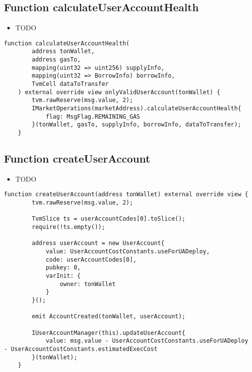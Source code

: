 \subsection{Function calculateUserAccountHealth}

\noindent\begin{itemize}
\item TODO
\end{itemize}

\begin{lstlisting}[firstnumber=446]
    function calculateUserAccountHealth(
        address tonWallet, 
        address gasTo,
        mapping(uint32 => uint256) supplyInfo,
        mapping(uint32 => BorrowInfo) borrowInfo,
        TvmCell dataToTransfer
    ) external override view onlyValidUserAccount(tonWallet) {
        tvm.rawReserve(msg.value, 2);
        IMarketOperations(marketAddress).calculateUserAccountHealth{
            flag: MsgFlag.REMAINING_GAS
        }(tonWallet, gasTo, supplyInfo, borrowInfo, dataToTransfer);
    }
\end{lstlisting}

\subsection{Function createUserAccount}

\noindent\begin{itemize}
\item TODO
\end{itemize}

\begin{lstlisting}[firstnumber=97]
    function createUserAccount(address tonWallet) external override view {
        tvm.rawReserve(msg.value, 2);

        TvmSlice ts = userAccountCodes[0].toSlice();
        require(!ts.empty());

        address userAccount = new UserAccount{
            value: UserAccountCostConstants.useForUADeploy,
            code: userAccountCodes[0],
            pubkey: 0,
            varInit: {
                owner: tonWallet
            }
        }();

        emit AccountCreated(tonWallet, userAccount);

        IUserAccountManager(this).updateUserAccount{
            value: msg.value - UserAccountCostConstants.useForUADeploy - UserAccountCostConstants.estimatedExecCost
        }(tonWallet);
    }
\end{lstlisting}

